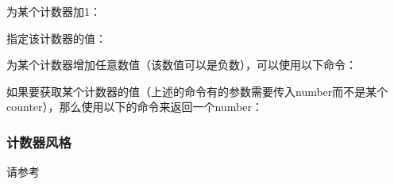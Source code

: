     为某个计数器加1：
    \begin{texcode}
    \end{texcode}
    指定该计数器的值：
    \begin{texcode}
        \setcounter{NameOfTheNewCounter}{number}
    \end{texcode}
    为某个计数器增加任意数值（该数值可以是负数），可以使用以下命令：
    \begin{texcode}
        \addtocounter{NameOfTheNewCounter}{number}
    \end{texcode}

    如果要获取某个计数器的值（上述的命令有的参数需要传入number而不是某个counter），那么使用以下的命令来返回一个number：
    \begin{texcode}
        \value{NameOfTheNewCounter}
    \end{texcode}
    
    \subsubsection{计数器风格}
    请参考